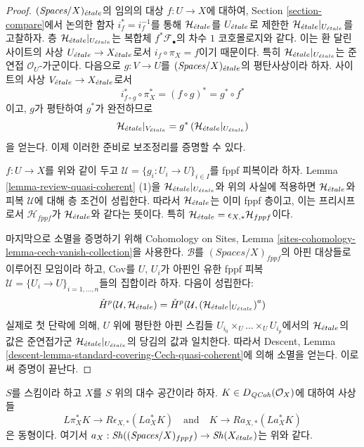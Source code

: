 \begin{proof}
$(\textit{Spaces}/X)_{\acute{e}tale}$의 임의의 대상 $f : U \to X$에 대하여,
Section \ref{section-compare}에서 논의한 함자
$i_f^* = i_f^{-1}$를 통해 $\mathcal{H}_{\acute{e}tale}$를 $U_{\acute{e}tale}$로 제한한
$\mathcal{H}_{\acute{e}tale}|_{U_{\acute{e}tale}}$를 고찰하자.
층 $\mathcal{H}_{\acute{e}tale}|_{U_{\acute{e}tale}}$는 복합체
$f^*\mathcal{F}_\bullet$의 차수 $1$ 코호몰로지와 같다.
이는 환 달린 사이트의 사상 $U_{\acute{e}tale} \to X_{\acute{e}tale}$로서
$i_f \circ \pi_X = f$이기 때문이다. 특히
$\mathcal{H}_{\acute{e}tale}|_{U_{\acute{e}tale}}$는 준연접 $\mathcal{O}_U$-가군이다.
다음으로 $g : V \to U$를 $(\textit{Spaces}/X)_{\acute{e}tale}$의 평탄사상이라
하자. 사이트의 사상 $V_{\acute{e}tale} \to X_{\acute{e}tale}$로서
$$
i_{f \circ g}^* \circ \pi_X^* = (f \circ g)^* = g^* \circ f^*
$$
이고, $g$가 평탄하여 $g^*$가 완전하므로
$$
\mathcal{H}_{\acute{e}tale}|_{V_{\acute{e}tale}} =
g^*\left(\mathcal{H}_{\acute{e}tale}|_{U_{\acute{e}tale}}\right)
$$
을 얻는다. 이제 이러한 준비로 보조정리를 증명할 수 있다.

\medskip\noindent
$f : U \to X$를 위와 같이 두고
$\mathcal{U} = \{g_i : U_i \to U\}_{i \in I}$를 fppf 피복이라 하자.
Lemma \ref{lemma-review-quasi-coherent} (1)을
$\mathcal{H}_{\acute{e}tale}|_{U_{\acute{e}tale}}$와 위의 사실에 적용하면
$\mathcal{H}_{\acute{e}tale}$와 피복 $\mathcal{U}$에 대해 층 조건이 성립한다.
따라서 $\mathcal{H}_{\acute{e}tale}$는 이미 fppf 층이고, 이는 프리시프로서
$\mathcal{H}_{fppf}$가 $\mathcal{H}_{\acute{e}tale}$와 같다는 뜻이다.
특히 $\mathcal{H}_{\acute{e}tale} = \epsilon_{X, *}\mathcal{H}_{fppf}$이다.

\medskip\noindent
마지막으로 소멸을 증명하기 위해 Cohomology on Sites, Lemma
\ref{sites-cohomology-lemma-cech-vanish-collection}을 사용한다.
$\mathcal{B}$를 $(\textit{Spaces}/X)_{fppf}$의 아핀 대상들로 이루어진
모임이라 하고, $\text{Cov}$를 $U$, $U_i$가 아핀인 유한 fppf 피복
$\mathcal{U} = \{U_i \to U\}_{i = 1, \ldots, n}$들의 집합이라 하자.
다음이 성립한다:
$$
{\check H}^p(\mathcal{U}, \mathcal{H}_{\acute{e}tale}) =
{\check H}^p(\mathcal{U}, \left(\mathcal{H}_{\acute{e}tale}|_{U_{\acute{e}tale}}\right)^a)
$$
실제로 첫 단락에 의해, $U$ 위에 평탄한 아핀 스킴들
$U_{i_0} \times_U \ldots \times_U U_{i_p}$에서의
$\mathcal{H}_{\acute{e}tale}$의 값은 준연접가군
$\mathcal{H}_{\acute{e}tale}|_{U_{\acute{e}tale}}$의 당김의 값과 일치한다.
따라서 Descent, Lemma
\ref{descent-lemma-standard-covering-Cech-quasi-coherent}에 의해
소멸을 얻는다. 이로써 증명이 끝난다.
\end{proof}

\begin{lemma}
\label{lemma-cohomological-descent-etale-fppf-modules-unbounded}
$S$를 스킴이라 하고 $X$를 $S$ 위의 대수 공간이라 하자.
$K \in D_{\mathit{QCoh}}(\mathcal{O}_X)$에 대하여 사상들
$$
L\pi_X^*K \longrightarrow R\epsilon_{X, *}(La_X^*K)
\quad\text{and}\quad
K \longrightarrow Ra_{X, *}(La_X^*K)
$$
은 동형이다. 여기서
$a_X : \mathop{\mathit{Sh}}\nolimits((\textit{Spaces}/X)_{fppf}) \to \mathop{\mathit{Sh}}\nolimits(X_{\acute{e}tale})$는 위와 같다.
\end{lemma}

